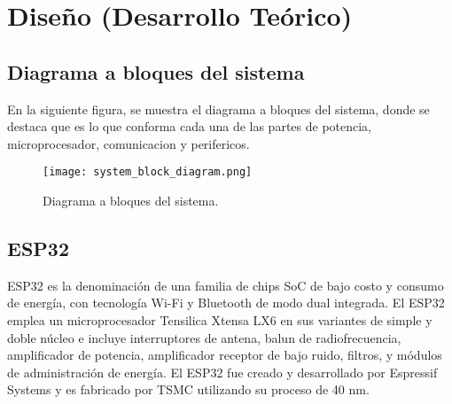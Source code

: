


\section{Diseño (Desarrollo Teórico)}
\subsection{Diagrama a bloques del sistema}
En la siguiente figura, se muestra el diagrama a bloques del sistema, donde se destaca que es lo que
conforma cada una de las partes de potencia, microprocesador, comunicacion y perifericos.
\begin{figure}[htp]
    \centering
    \texttt{[image: system\_block\_diagram.png]}
    \caption{Diagrama a bloques del sistema.}
\end{figure}

\subsection{ESP32}
ESP32 es la denominación de una familia de chips SoC de bajo costo y consumo de energía, con tecnología Wi-Fi
y Bluetooth de modo dual integrada. El ESP32 emplea un microprocesador Tensilica Xtensa LX6 en sus variantes
de simple y doble núcleo e incluye interruptores de antena, balun de radiofrecuencia, amplificador de potencia,
amplificador receptor de bajo ruido, filtros, y módulos de administración de energía. El ESP32 fue creado y
desarrollado por Espressif Systems y es fabricado por TSMC utilizando su proceso de 40 nm.


